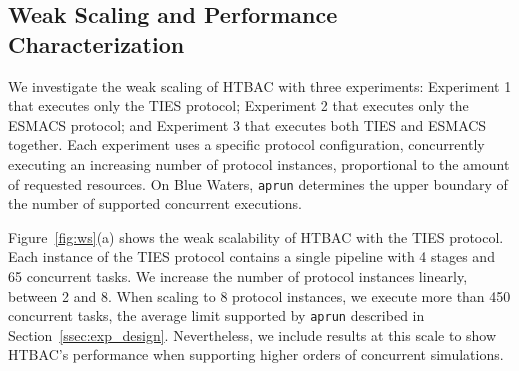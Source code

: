 \subsection{Weak Scaling and Performance Characterization}

We investigate the weak scaling of HTBAC with three experiments: Experiment 1
that executes only the TIES protocol; Experiment 2 that executes only the
ESMACS protocol; and Experiment 3 that executes both TIES and ESMACS
together. Each experiment uses a specific protocol configuration,
concurrently executing an increasing number of protocol instances,
proportional to the amount of requested resources. On Blue Waters,
\texttt{aprun} determines the upper boundary of the number of supported
concurrent executions.


Figure~\ref{fig:ws}(a) shows the weak scalability of HTBAC with the TIES
protocol. Each instance of the TIES protocol contains a single pipeline with
4 stages and 65 concurrent tasks. We increase the number of protocol
instances linearly, between 2 and 8. When scaling to 8 protocol instances, we
execute more than 450 concurrent tasks, the average limit supported by
\texttt{aprun} described in Section~\ref{ssec:exp_design}. Nevertheless, we
include results at this scale to show HTBAC's performance when supporting
higher orders of concurrent simulations.

